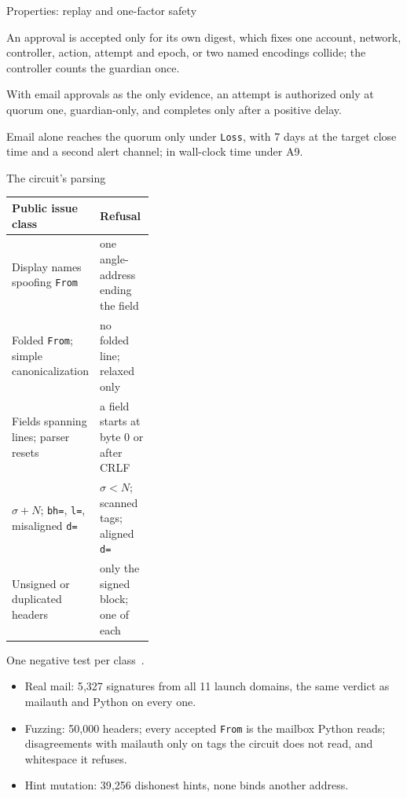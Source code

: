 \documentclass[aspectratio=169,11pt]{beamer}
\begin{document}
\begin{frame}{Properties: replay and one-factor safety}
  \small
  \begin{description}
    \item[Replay] An approval is accepted only for its own digest, which fixes
      one account, network, controller, action, attempt and epoch, or two
      named encodings collide; the controller counts the guardian
      once.
    \item[One factor] With email approvals as the only evidence, an attempt is
      authorized only at quorum one, guardian-only, and completes only after
      a positive delay.
    \item[Wallet] Email alone reaches the quorum only under \texttt{Loss},
      with 7 days at the target close time and a second alert
      channel; in wall-clock time under A9.
  \end{description}
\end{frame}

\begin{frame}{The circuit's parsing}
  \footnotesize
  \begin{tabularx}{\linewidth}{@{}>{\raggedright\arraybackslash}p{0.36\linewidth}>{\raggedright\arraybackslash}X@{}}
    \toprule
    Public issue class & Refusal \\
    \midrule
    Display names spoofing \texttt{From} & one angle-address ending the field \\
    Folded \texttt{From}; simple canonicalization & no folded line; relaxed only \\
    Fields spanning lines; parser resets & a field starts at byte 0 or after CRLF \\
    $\sigma + N$; \texttt{bh=}, \texttt{l=}, misaligned \texttt{d=} & $\sigma < N$; scanned tags; aligned \texttt{d=} \\
    Unsigned or duplicated headers & only the signed block; one of each \\
    \bottomrule
  \end{tabularx}
  \par\smallskip
  One negative test per class~\cite{audit-matterlabs-2024,audit-veridise-2024,audit-consensys-2024}.
  \par\medskip
  \small
  \begin{itemize}
    \item Real mail: 5{,}327 signatures from all 11 launch domains, the same
      verdict as mailauth and Python on every one.
    \item Fuzzing: 50{,}000 headers; every accepted \texttt{From} is the
      mailbox Python reads; disagreements with mailauth only on tags the
      circuit does not read, and whitespace it refuses.
    \item Hint mutation: 39{,}256 dishonest hints, none binds another
      address.
  \end{itemize}
\end{frame}
\end{document}
